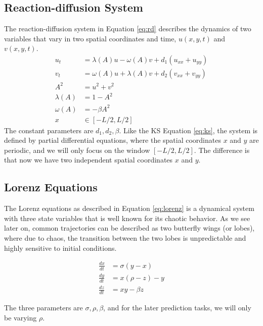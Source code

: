 \documentclass[letterpaper, 10 pt, conference]{ieeeconf}  %
\begin{document}
\subsection{Reaction-diffusion System}
\label{section:rd}
The reaction-diffusion system in Equation \ref{eq:rd} describes the dynamics of two variables that vary in two spatial coordinates and time, $u(x,y,t)$ and $v(x,y,t)$.
\begin{equation}
\label{eq:rd}
\begin{split}
u_t &= \lambda(A) u - \omega(A) v + d_1 (u_{xx} + u_{yy}) \\
v_t &= \omega(A) u + \lambda(A) v + d_2 (v_{xx} + v_{yy}) \\
A^2 &= u^2 + v^2 \\
\lambda(A) &= 1 - A^2 \\
\omega(A) &= -\beta A^2 \\
x &\in [-L/2, L/2]
\end{split}
\end{equation}
The constant parameters are $d_1, d_2, \beta$. Like the KS Equation \ref{eq:ks}, the system is defined by partial differential equations, where the spatial coordinates $x$ and $y$ are periodic, and we will only focus on the window $[-L/2, L/2]$. The difference is that now we have two independent spatial coordinates $x$ and $y$.

\subsection{Lorenz Equations}
The Lorenz equations as described in Equation \ref{eq:lorenz} is a dynamical system with three state variables that is well known for its chaotic behavior. As we see later on, common trajectories can be described as two butterfly wings (or lobes), where due to chaos, the transition between the two lobes is unpredictable and highly sensitive to initial conditions.

\begin{equation}
\label{eq:lorenz}
\begin{split}
\frac{dx}{dt} &= \sigma(y-x) \\
\frac{dy}{dt} &= x(\rho - z) - y \\
\frac{dz}{dt} &= xy - \beta z
\end{split}
\end{equation}

The three parameters are $\sigma, \rho, \beta$, and for the later prediction tasks, we will only be varying $\rho$.
\end{document}
